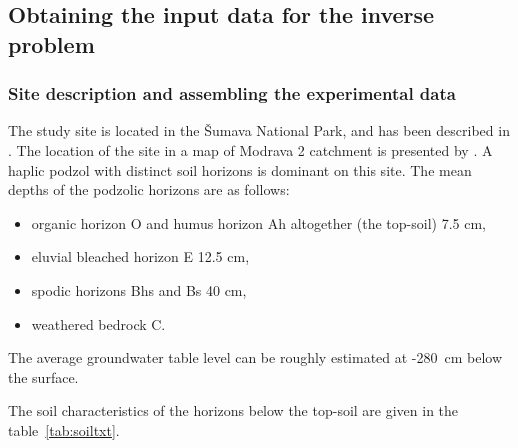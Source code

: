 \documentclass[review]{elsarticle}
\begin{document}
\subsection{Obtaining the input data for the inverse problem}
\label{assamb}


\subsubsection{Site description and assembling the experimental data}%
\label{site}
The study site is located in the \v{S}umava National Park, and has been described in \citep{Jacka1}. The location of the site in a map of Modrava 2 catchment is presented by \cite{Jacka2}.
A haplic podzol with distinct soil horizons is dominant on this site. The mean depths of the podzolic horizons are as follows:
\begin{itemize}
\item organic horizon O and humus horizon Ah altogether (the top-soil) 7.5 cm, 
\item eluvial bleached horizon E 12.5 cm, 
\item spodic horizons Bhs and Bs 40 cm,
\item weathered bedrock C.
\end{itemize}
The average groundwater table level can be roughly estimated at -280~cm below the surface. 

The soil characteristics of the horizons below the top-soil %
are given in the table~\ref{tab:soiltxt}.

%
\end{document}
